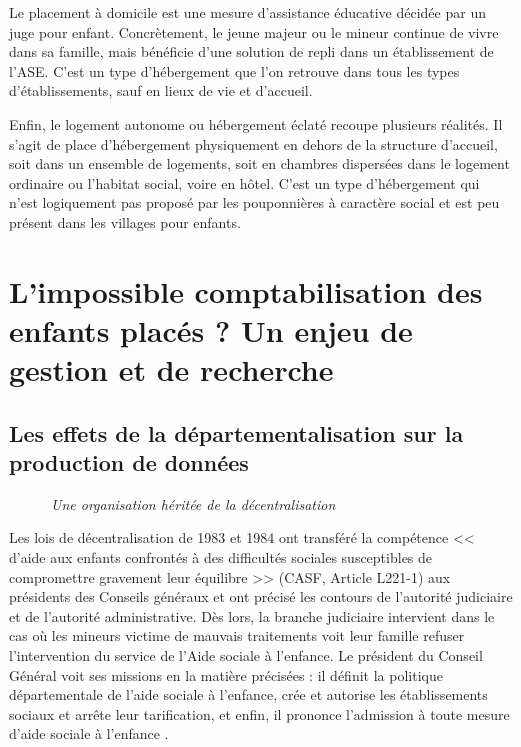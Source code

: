 \documentclass[
  12,
  a4paper,
]{report}
\begin{document}
Le placement à domicile est une mesure d'assistance éducative décidée
par un juge pour enfant. Concrètement, le jeune majeur ou le mineur
continue de vivre dans sa famille, mais bénéficie d'une solution de
repli dans un établissement de l'ASE. C'est un type d'hébergement que
l'on retrouve dans tous les types d'établissements, sauf en lieux de vie
et d'accueil.

Enfin, le logement autonome ou hébergement éclaté recoupe plusieurs
réalités. Il s'agit de place d'hébergement physiquement en dehors de la
structure d'accueil, soit dans un ensemble de logements, soit en
chambres dispersées dans le logement ordinaire ou l'habitat social,
voire en hôtel. C'est un type d'hébergement qui n'est logiquement pas
proposé par les pouponnières à caractère social et est peu présent dans
les villages pour enfants.

\hypertarget{limpossible-comptabilisation-des-enfants-placuxe9s-un-enjeu-de-gestion-et-de-recherche}{%
\section{L'impossible comptabilisation des enfants placés ? Un enjeu de
gestion et de
recherche}\label{limpossible-comptabilisation-des-enfants-placuxe9s-un-enjeu-de-gestion-et-de-recherche}}

\hypertarget{les-effets-de-la-duxe9partementalisation-sur-la-production-de-donnuxe9es}{%
\subsection{Les effets de la départementalisation sur la production de
données}\label{les-effets-de-la-duxe9partementalisation-sur-la-production-de-donnuxe9es}}

~~~~~~\emph{Une organisation héritée de la décentralisation}

Les lois de décentralisation de 1983 et 1984 ont transféré la compétence
\textless\textless{} d'aide aux enfants confrontés à des difficultés
sociales susceptibles de compromettre gravement leur équilibre
\textgreater\textgreater{} (CASF, Article L221-1) aux présidents des
Conseils généraux et ont précisé les contours de l'autorité judiciaire
et de l'autorité administrative. Dès lors, la branche judiciaire
intervient dans le cas où les mineurs victime de mauvais traitements
voit leur famille refuser l'intervention du service de l'Aide sociale à
l'enfance. Le président du Conseil Général voit ses missions en la
matière précisées : il définit la politique départementale de l'aide
sociale à l'enfance, crée et autorise les établissements sociaux et
arrête leur tarification, et enfin, il prononce l'admission à toute
mesure d'aide sociale à l'enfance .
\end{document}

